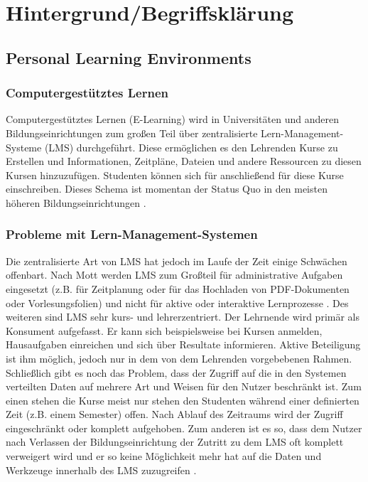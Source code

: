 \chapter{Hintergrund/Begriffsklärung} 
\label{Kapitel 2}
\section{Personal Learning Environments}
\subsection{Computergestütztes Lernen}\label{section:e-learning}
Computergestütztes Lernen (E-Learning) wird in Universitäten und anderen Bildungseinrichtungen zum großen Teil über zentralisierte Lern-Management-Systeme (LMS) durchgeführt. Diese ermöglichen es den Lehrenden Kurse zu Erstellen und Informationen, Zeitpläne, Dateien und andere Ressourcen zu diesen Kursen hinzuzufügen. Studenten können sich für anschließend für diese Kurse einschreiben. Dieses Schema ist momentan der Status Quo in den meisten höheren Bildungseinrichtungen \cite{Mott2010}. 

\subsection{Probleme mit Lern-Management-Systemen}
Die zentralisierte Art von LMS hat jedoch im Laufe der Zeit einige Schwächen offenbart. Nach Mott werden LMS zum Großteil für administrative Aufgaben eingesetzt (z.B. für Zeitplanung oder für das Hochladen von PDF-Dokumenten oder Vorlesungsfolien) und nicht für aktive oder interaktive Lernprozesse \cite{Mott2010}. Des weiteren sind LMS sehr kurs- und lehrerzentriert. Der Lehrnende wird primär als Konsument aufgefasst. Er kann sich beispielsweise bei Kursen anmelden, Hausaufgaben einreichen und sich über Resultate informieren. Aktive Beteiligung ist ihm möglich, jedoch nur in dem von dem Lehrenden vorgebebenen Rahmen.
Schließlich gibt es noch das Problem, dass der Zugriff auf die in den Systemen verteilten Daten auf mehrere Art und Weisen für den Nutzer beschränkt ist. Zum einen stehen die Kurse meist nur stehen den Studenten während einer definierten Zeit (z.B. einem Semester) offen. Nach Ablauf des Zeitraums wird der Zugriff eingeschränkt oder komplett aufgehoben. Zum anderen ist es so, dass dem Nutzer nach Verlassen der Bildungseinrichtung der Zutritt zu dem LMS oft komplett verweigert wird und er so keine Möglichkeit mehr hat auf die Daten und Werkzeuge innerhalb des LMS zuzugreifen \cite{Schaffert2008a}.

